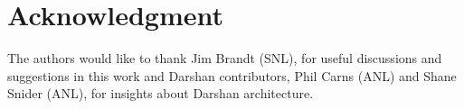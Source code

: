 \section{Acknowledgment}
The authors would like to thank Jim Brandt (SNL), for useful discussions and suggestions in this work and Darshan contributors, Phil Carns (ANL) and Shane Snider (ANL), for insights about Darshan architecture.

